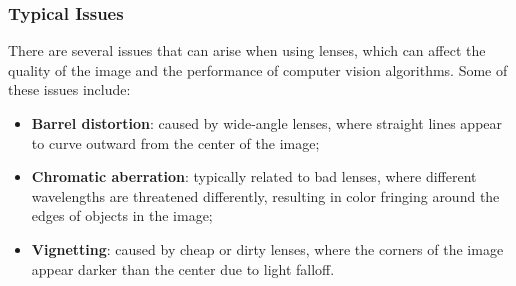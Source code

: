 \subsubsection{Typical Issues}
There are several issues that can arise when using lenses, which can affect the quality of the image and the performance of computer vision algorithms. 
Some of these issues include:
\begin{itemize}
    \item \textbf{Barrel distortion}: caused by wide-angle lenses, where straight lines appear to curve outward from the center of the image;
    \item \textbf{Chromatic aberration}: typically related to bad lenses, where different wavelengths are threatened differently, 
    resulting in color fringing around the edges of objects in the image;
    \item \textbf{Vignetting}: caused by cheap or dirty lenses, where the corners of the image appear darker than the center due to light falloff.
\end{itemize}